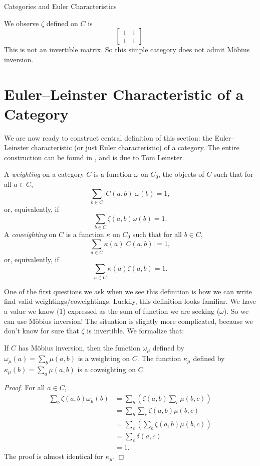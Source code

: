 \documentclass[12pt]{pom_thesis}
\begin{document}
\begin{chapter}{Categories and Euler Characteristics}
\begin{examp}
We observe $\zeta$ defined on $C$ is
\[\begin{bmatrix}1 & 1 \\ 1 & 1 \end{bmatrix}.\]
This is not an invertible matrix. So this simple category does not admit M\"obius inversion.
\end{examp} 

\section{Euler--Leinster Characteristic of a Category}
We are now ready to construct central definition of this section: the Euler--Leinster characteristic (or just Euler characteristic) of a category. The entire construction can be found in \cite{Lein1, Lein2, Lein4}, and is due to Tom Leinster.

\begin{defn}\label{def_weighting}
A \emph{weighting} on a category $C$ is a function $\omega$ on $C_0$, the objects of $C$ such that for all $a \in C$,
\[
\sum_{b \in C}|C(a,b)|\omega(b) = 1,
\]
or, equivalently, if
\[
\sum_{b \in C}\zeta(a,b)\omega(b) = 1.
\]
A \emph{coweighting} on $C$ is a function $\kappa$ on $C_0$ such that for all $b \in C$, 
\[
\sum_{a \in C}\kappa(a)|C(a,b)| = 1,
\]
or, equivalently, if
\[
\sum_{a \in C}\kappa(a)\zeta(a, b) = 1.
\]
\end{defn}

One of the first questions we ask when we see this definition is how we can write find valid weightings/coweightings. Luckily, this definition looks familiar. We have a value we know (1) expressed as the sum of function we are seeking ($\omega$). So we can use M\"obius inversion! The situation is slightly more complicated, because we don't know for sure that $\zeta$ is invertible. We formalize that:

\begin{lemma}
\label{mobius_is_weighting}
If $C$ has M\"obius inversion, then the function $\omega_\mu$ defined by $\omega_\mu(a) = \sum_b \mu(a,b)$ is a weighting on $C$. The function $\kappa_\mu$ defined by $\kappa_\mu(b) = \sum_a \mu(a,b)$ is a coweighting on $C$.
\end{lemma}
\begin{proof} For all $a \in C$,
\begin{align*}
\sum_b \zeta(a,b)\omega_\mu(b) &= \sum_b\left( \zeta(a,b)\sum_c \mu(b,c)\right)\\
&=\sum_b\sum_c\zeta(a,b)\mu(b,c)\\
&=\sum_c\left(\sum_b\zeta(a,b)\mu(b,c)\right)\\
&=\sum_c \delta(a,c)\\
&=1.
\end{align*}
The proof is almost identical for $\kappa_\mu$.
\end{proof}


\end{chapter}
\end{document}
